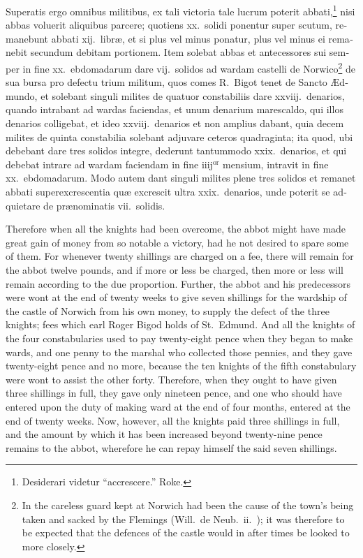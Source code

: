 \documentclass[10pt]{book}
\begin{document}
\begin{paracol}{2}
\begin{otherlanguage}{latin}
Superatis ergo omnibus militibus, ex tali victoria tale lucrum poterit abbati,\footnote[\textdagger]{Desiderari videtur ``accrescere.'' Roke.} nisi abbas voluerit aliquibus parcere; quotiens xx.\ solidi ponentur super scutum, remanebunt abbati xij.\ libr\ae{}, et si plus vel minus ponatur, plus vel minus ei remanebit secundum debitam portionem. Item solebat abbas et antecessores sui semper in fine xx.\ ebdomadarum dare vij.\ solidos ad wardam castelli de Norwico\footnote[\textdagger]{In  the careless guard kept at Norwich had been the cause of the town's being taken and sacked by the Flemings (Will.\ de Neub.\ ii.\ ); it was therefore to be expected that the defences of the castle would in after times be looked to more closely.} de sua bursa pro defectu trium militum, quos comes R.\ Bigot tenet de Sancto \AE{}dmundo, et solebant singuli milites de quatuor constabiliis dare xxviij.\ denarios, quando intrabant ad wardas faciendas, et unum denarium marescaldo, qui illos denarios colligebat, et ideo xxviij.\ denarios et non amplius dabant, quia decem milites de quinta constabilia solebant adjuvare ceteros quadraginta; ita quod, ubi debebant dare tres solidos integre, dederunt tantummodo xxix.\ denarios, et qui debebat intrare ad wardam faciendam in fine iiij$^\text{or}$ mensium, intravit in fine xx.\ ebdomadarum. Modo autem dant singuli milites plene tres solidos et remanet abbati superexcrescentia qu\ae{} excrescit ultra xxix.\ denarios, unde poterit se adquietare de pr\ae{}nominatis vii.\ solidis.
\end{otherlanguage}

\switchcolumn

Therefore when all the knights had been overcome, the abbot might have made great gain of money from so notable a victory, had he not desired to spare some of them. For whenever twenty shillings are charged on a fee, there will remain for the abbot twelve pounds, and if more or less be charged, then more or less will remain according to the due proportion. Further, the abbot and his predecessors were wont at the end of twenty weeks to give seven shillings for the wardship of the castle of Norwich from his own money, to supply the defect of the three knights; fees which earl Roger Bigod holds of St.\ Edmund. And all the knights of the four constabularies used to pay twenty-eight pence when they began to make wards, and one penny to the marshal who collected those pennies, and they gave twenty-eight pence and no more, because the ten knights of the fifth constabulary were wont to assist the other forty. Therefore, when they ought to have given three shillings in full, they gave only nineteen pence, and one who should have entered upon the duty of making ward at the end of four months, entered at the end of twenty weeks. Now, however, all the knights paid three shillings in full, and the amount by which it has been increased beyond twenty-nine pence remains to the abbot, wherefore he can repay himself the said seven shillings.


\end{paracol}
\end{document}
